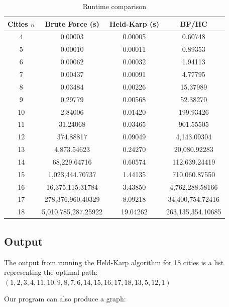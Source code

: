 \documentclass[11pt,fleqn]{article}
\begin{document}
\begin{table}[H]
  \centering
  \caption*{Runtime comparison}
  \begin{tabular}{c|c|c|c}
    \toprule
    Cities $n$ & Brute Force (s) & Held-Karp (s) & BF/HC \\
    \midrule
    4   &       0.00003       &    0.00005    &      0.60748      \\
    5   &       0.00010       &    0.00011    &      0.89353      \\
    6   &       0.00062       &    0.00032    &      1.94113      \\
    7   &       0.00437       &    0.00091    &      4.77795      \\
    8   &       0.03484       &    0.00226    &      15.37989     \\
    9   &       0.29779       &    0.00568    &      52.38270     \\ 
    10  &       2.84006       &    0.01420    &     199.93426     \\
    11  &       31.24068      &    0.03465    &     901.55505     \\
    12  &      374.88817      &    0.09049    &    4,143.09304    \\
    13  &     4,873.54623     &    0.24270    &    20,080.92283   \\
    14  &     68,229.64716    &    0.60574    &   112,639.24419   \\
    15  &   1,023,444.70737   &    1.44135    &   710,060.87550   \\
    16  &   16,375,115.31784  &    3.43850    &  4,762,288.58166  \\
    17  &  278,376,960.40329  &    8.09218    &  34,400,754.72416 \\
    18  & 5,010,785,287.25922 &    19.04262   & 263,135,354.10685 \\
    \bottomrule
  \end{tabular}
\end{table}

\subsection{Output}
The output from running the Held-Karp algorithm for 18 cities is a
list representing the optimal path:
$(1, 2, 3, 4, 11, 10, 9, 8, 7, 6, 14, 15, 16, 17, 18, 13, 5, 12, 1)$

Our program can also produce a graph:
\end{document}
